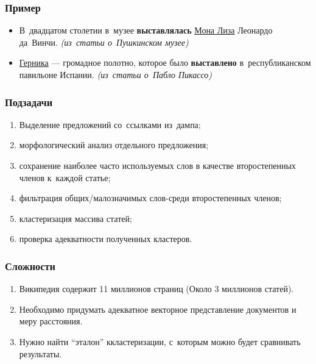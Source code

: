 \documentclass{beamer}
\begin{document}
\begin{frame}
\frametitle{Пример}
\begin{itemize}

\item {
В~двадцатом столетии в~музее {\bf выставлялась} \underline{Мона Лиза} Леонардо да~Винчи. {\it (из~статьи о~Пушкинском музее)}
}

\item {
\underline{Герника} --- громадное полотно, которое было {\bf выставлено} в~республиканском павильоне Испании. {\it (из~статьи о~Пабло Пикассо)}
}

\end{itemize}
\end{frame}

\begin{frame}
\frametitle{Подзадачи}
\begin{enumerate}

\item {
Выделение предложений со~ссылками из~дампа;
}
\item {
морфологический анализ отдельного предложения;
}
\item {
сохранение наиболее часто используемых слов в качестве второстепенных членов к~каждой статье;
}
\item {
фильтрация общих/малозначимых слов-среди второстепенных членов;
}
\item {
кластеризация массива статей;
}
\item {
проверка адекватности полученных кластеров.
}

\end{enumerate}
\end{frame}

\begin{frame}
\frametitle{Сложности}
\begin{enumerate}

\item {
Википедия содержит 11 миллионов страниц (Около 3 миллионов статей).
}
\item {
Необходимо придумать адекватное векторное представление документов и меру расстояния.
}
\item {
Нужно найти ``эталон'' ккластеризации, с~которым можно будет сравнивать результаты.
}

\end{enumerate}
\end{frame}
\end{document}
